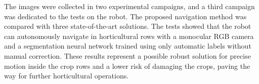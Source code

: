 The images were collected in two experimental campaigns, and a third campaign was dedicated to the tests on the robot. The proposed navigation method was compared with three state-of-the-art solutions. The tests showed that the robot can autonomously navigate in horticultural rows with a monocular RGB camera and a segmentation neural network trained using only automatic labels without manual correction. These results represent a possible robust solution for precise motion inside the crop rows and a lower risk of damaging the crops, paving the way for further horticultural operations.
